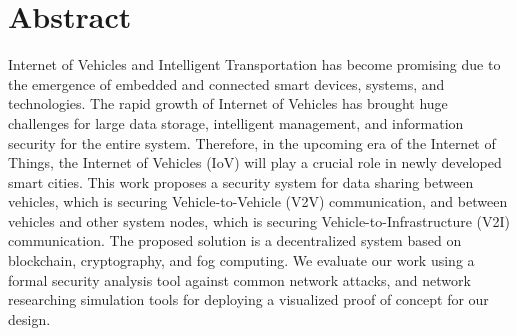 \section*{\centering\huge Abstract}
	\vspace{.75cm}
	Internet of Vehicles and Intelligent Transportation has become promising due to the emergence of embedded and connected smart devices, systems, and technologies. The rapid growth of Internet of Vehicles has brought huge challenges for large data storage, intelligent management, and information security for the entire system. Therefore, in the upcoming era of the Internet of Things, the Internet of Vehicles (IoV) will play a crucial role in newly developed smart cities. This work proposes a security system for data sharing between vehicles, which is securing Vehicle-to-Vehicle (V2V) communication, and between vehicles and other system nodes, which is securing Vehicle-to-Infrastructure (V2I) communication. The proposed solution is a decentralized system based on blockchain, cryptography, and fog computing. We evaluate our work using a formal security analysis tool against common network attacks, and network researching simulation tools for deploying a visualized proof of concept for our design. \\ \\
	\indent {}

\newpage
